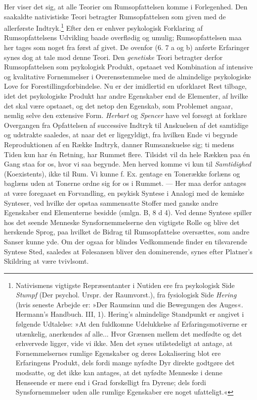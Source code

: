 \documentclass[12pt,a4paper,openany]{book}
\newcommand{\opage}[1]{\marginnote{\footnotesize\textit{[#1]}}}
\begin{document}
Her viser det sig, at alle Teorier om Rumsopfattelsen komme i
Forlegenhed. Den saakaldte nativistiske Teori betragter Rumsopfattelsen
som given med de allerførste Indtryk.\footnote[1]{Nativismens vigtigste
Repræsentanter i Nutiden ere fra psykologisk Side \emph{Stumpf} (Der
psychol. Urspr. der Raumvorst.), fra fysiologisk Side \emph{Hering}
(hvis seneste Arbejde er: »Der Raumsinn und die Bewegungen des Auges«.
Hermann’s Handbuch. III, 1). Hering’s almindelige Standpunkt er angivet
i følgende Udtalelse: »At den fuldkomne Udelukkelse af
Erfaringsmotiverne er utænkelig, anerkendes af alle... Hvor Grænsen
mellem det medfødte og det erhvervede ligger, vide vi ikke. Men det
synes utilstedeligt at antage, at Fornemmelsernes rumlige Egenskaber og
deres Lokalisering blot ere Erfaringens Produkt, dels fordi mange
nyfødte Dyr direkte godtgøre det modsatte, og det ikke kan antages, at
det nyfødte Menneske i denne Henseende er mere end i Grad forskelligt
fra Dyrene; dels fordi Synsfornemmelser uden alle rumlige Egenskaber ere
noget ufatteligt.«} Efter den er enhver psykologisk Forklaring af
Rumsopfattelsens Udvikling baade overflødig og umulig; Rumsopfattelsen
maa her tages som noget fra først af givet. De ovenfor (6. 7 a og b)
anførte Erfaringer synes dog at tale mod denne Teori. Den
\emph{genetiske} Teori betragter derfor Rumsopfattelsen som psykologisk
Produkt, opstaaet ved Kombination af intensive og kvalitative
Fornemmelser i Overensstemmelse med de almindelige psykologiske Love for
Forestillingsforbindelse. Nu er der imidlertid en uforklaret Rest
tilbage, idet det psykologiske
\opage{247}Produkt har andre Egenskaber end de Elementer, af hvilke det
skal være opstaaet, og det netop den Egenskab, som Problemet angaar,
nemlig selve den extensive Form. \emph{Herbart} og \emph{Spencer} have
vel forsøgt at forklare Overgangen fra Opfattelsen af successive Indtryk
til Anskuelsen af det samtidige og udstrakte saaledes, at naar det er
ligegyldigt, fra hvilken Ende vi begynde Reproduktionen af en Række
Indtryk, danner Rumsanskuelse sig; ti medens Tiden kun har én Retning,
har Rummet flere. Tilsidst vil da hele Rækken paa én Gang staa for os,
hvor vi saa begynde. Men herved komme vi kun til \emph{Samtidighed}
(Koexistents), ikke til Rum. Vi kunne f. Ex. gentage en Tonerække
forlæns og baglæns uden at Tonerne ordne sig for os i Rummet. --- Her
maa derfor antages at være foregaaet en Forvandling, en psykisk Syntese
i Analogi med de kemiske Synteser, ved hvilke der opstaa sammensatte
Stoffer med ganske andre Egenskaber end Elementerne besidde (smlgn. B, 8
d 4). Ved denne Syntese spiller hos det seende Menneske
Synsfornemmelserne den vigtigste Rolle og blive det herskende Sprog, paa
hvilket de Bidrag til Rumsopfattelse oversættes, som andre Sanser kunne
yde. Om der ogsaa for blindes Vedkommende finder en tilsvarende Syntese
Sted, saaledes at Følesansen bliver den dominerende, synes efter
Platner’s Skildring at være tvivlsomt.
\end{document}

